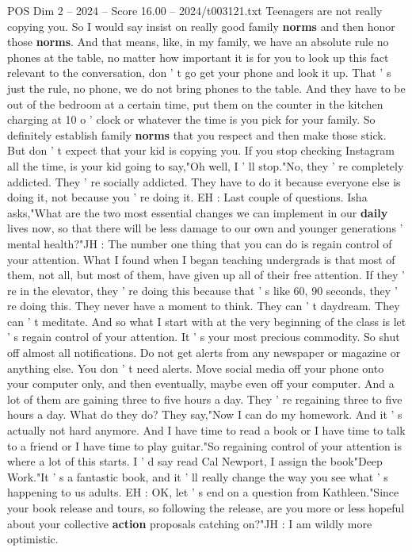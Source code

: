 \begin{textsample}{POS Dim 2 – 2024 – Score 16.00 – 2024/t003121.txt}
Teenagers are not really copying you.
So I would say insist on really good family \textbf{norms} and then honor those \textbf{norms}.
And that means, like, in my family, we have an absolute rule no phones at the table, no matter how important it is for you to look up this fact relevant to the conversation, don ' t go get your phone and look it up.
That ' s just the rule, no phone, we do not bring phones to the table.
And they have to be out of the bedroom at a certain time, put them on the counter in the kitchen charging at 10 o ' clock or whatever the time is you pick for your family.
So definitely establish family \textbf{norms} that you respect and then make those stick.
But don ' t expect that your kid is copying you.
If you stop checking Instagram all the time, is your kid going to say,"Oh well, I ' ll stop."No, they ' re completely addicted.
They ' re socially addicted.
They have to do it because everyone else is doing it, not because you ' re doing it.
EH : Last couple of questions.
Isha asks,"What are the two most essential changes we can implement in our \textbf{daily} lives now, so that there will be less damage to our own and younger generations ' mental health?"JH : The number one thing that you can do is regain control of your attention.
What I found when I began teaching undergrads is that most of them, not all, but most of them, have given up all of their free attention.
If they ' re in the elevator, they ' re doing this because that ' s like 60, 90 seconds, they ' re doing this.
They never have a moment to think.
They can ' t daydream.
They can ' t meditate.
And so what I start with at the very beginning of the class is let ' s regain control of your attention.
It ' s your most precious commodity.
So shut off almost all notifications.
Do not get alerts from any newspaper or magazine or anything else.
You don ' t need alerts.
Move social media off your phone onto your computer only, and then eventually, maybe even off your computer.
And a lot of them are gaining three to five hours a day.
They ' re regaining three to five hours a day.
What do they do?
They say,"Now I can do my homework.
And it ' s actually not hard anymore.
And I have time to read a book or I have time to talk to a friend or I have time to play guitar."So regaining control of your attention is where a lot of this starts.
I ' d say read Cal Newport, I assign the book"Deep Work."It ' s a fantastic book, and it ' ll really change the way you see what ' s happening to us adults.
EH : OK, let ' s end on a question from Kathleen."Since your book release and tours, so following the release, are you more or less hopeful about your collective \textbf{action} proposals catching on?"JH : I am wildly more optimistic.

\end{textsample}

